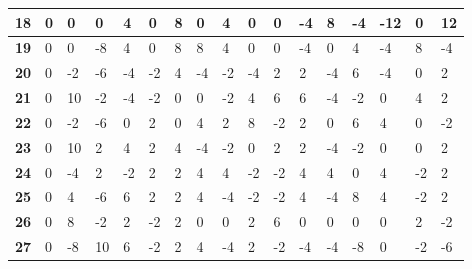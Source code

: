 \begin{longtable}[c]{|l|l|l|l|l|l|l|l|l|l|l|l|l|l|l|l|l|}
\textbf{18} & 0          & 0          & 0          & 4          & 0          & 8          & 0          & 4          & 0          & 0          & -4          & 8            & -4          & -12         & 0           & 12           \\ \hline
\textbf{19} & 0          & 0          & -8         & 4          & 0          & 8          & 8          & 4          & 0          & 0          & -4          & 0            & 4           & -4          & 8           & -4           \\ \hline
\textbf{20} & 0          & -2         & -6         & -4         & -2         & 4          & -4         & -2         & -4         & 2          & 2           & -4           & 6           & -4          & 0           & 2            \\ \hline
\textbf{21} & 0          & 10         & -2         & -4         & -2         & 0          & 0          & -2         & 4          & 6          & 6           & -4           & -2          & 0           & 4           & 2            \\ \hline
\textbf{22} & 0          & -2         & -6         & 0          & 2          & 0          & 4          & 2          & 8          & -2         & 2           & 0            & 6           & 4           & 0           & -2           \\ \hline
\textbf{23} & 0          & 10         & 2          & 4          & 2          & 4          & -4         & -2         & 0          & 2          & 2           & -4           & -2          & 0           & 0           & 2            \\ \hline
\textbf{24} & 0          & -4         & 2          & -2         & 2          & 2          & 4          & 4          & -2         & -2         & 4           & 4            & 0           & 4           & -2          & 2            \\ \hline
\textbf{25} & 0          & 4          & -6         & 6          & 2          & 2          & 4          & -4         & -2         & -2         & 4           & -4           & 8           & 4           & -2          & 2            \\ \hline
\textbf{26} & 0          & 8          & -2         & 2          & -2         & 2          & 0          & 0          & 2          & 6          & 0           & 0            & 0           & 0           & 2           & -2           \\ \hline
\textbf{27} & 0          & -8         & 10         & 6          & -2         & 2          & 4          & -4         & 2          & -2         & -4          & -4           & -8          & 0           & -2          & -6           \\ \hline

\end{longtable}
